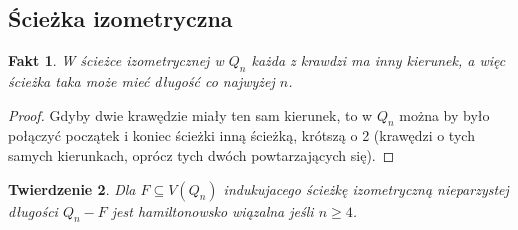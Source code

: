 \documentclass{pracamgr}
\newtheorem{theorem}{Twierdzenie}[chapter]
\newtheorem{fact}[theorem]{Fakt}
\begin{document}
   \subsection{Ścieżka izometryczna}
    \begin{fact}\label{sciezka izo - rozne kierunki}
     W ścieżce izometrycznej w $Q_n$ każda z krawdzi ma inny kierunek, a więc ścieżka taka może mieć długość co najwyżej $n$.
    \end{fact}
    \begin{proof}
     Gdyby dwie krawędzie miały ten sam kierunek, to w $Q_n$ można by było połączyć początek i koniec ścieżki inną ścieżką, krótszą o 2
     (krawędzi o tych samych kierunkach, oprócz tych dwóch powtarzających się).
    \end{proof}
    \begin{theorem}\label{hamilton - sciezka, nieparz}
     Dla $F\subseteq V(Q_n)$ indukujacego ścieżkę izometryczną nieparzystej długości $Q_n-F$ jest hamiltonowsko wiązalna jeśli $n\ge4$.
    \end{theorem}
\end{document}
